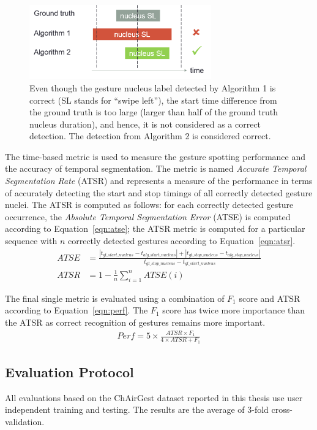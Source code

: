 \begin{figure}[tbh]
\centering
\includegraphics[width=0.7\textwidth]{figures/true_positive.png}
\caption{Even though the gesture nucleus label detected by Algorithm 1 is
correct (SL stands for ``swipe left''), the start time difference from the
ground truth is too large (larger than half of the ground truth nucleus
duration), and hence, it is not considered as a correct detection. The detection
from Algorithm 2 is considered correct.}
\label{fig:true-positive}
\end{figure}

The time-based metric is used to measure the gesture spotting performance and
the accuracy of temporal segmentation. The metric is named \textit{Accurate
Temporal Segmentation Rate} (ATSR) and represents a measure of the performance
in terms of accurately detecting the start and stop timings of all correctly
detected gesture nuclei. The ATSR is computed as follows: for each correctly detected gesture
occurrence, the \textit{Absolute Temporal Segmentation Error} (ATSE) is computed
according to Equation~\ref{eqn:atse}; the ATSR metric is computed for a
particular sequence with $n$ correctly detected gestures according to
Equation~\ref{eqn:atsr}.
\begin{align}
ATSE &= \frac{|t_{gt\_start\_nucleus} - t_{alg\_start\_nucleus}| +
|t_{gt\_stop\_nucleus} - t_{alg\_stop\_nucleus}|}{t_{gt\_stop\_nucleus} -
t_{gt\_start\_nucleus}} \label{eqn:atse} \\
ATSR &= 1 - \frac{1}{n}\sum_{i=1}^nATSE(i)
\label{eqn:atsr}
\end{align}

The final single metric is evaluated using a combination of $F_1$ score and ATSR
according to Equation~\ref{eqn:perf}. The $F_1$ score has twice more importance
than the ATSR as correct recognition of gestures remains more important.
\begin{align}
Perf = 5\times \frac{ATSR\times F_1}{4\times ATSR + F_1}\label{eqn:perf}
\end{align}

\subsection{Evaluation Protocol}
All evaluations based on the ChAirGest dataset reported in this thesis use user
independent training and testing. The results are the average of 3-fold
cross-validation.
